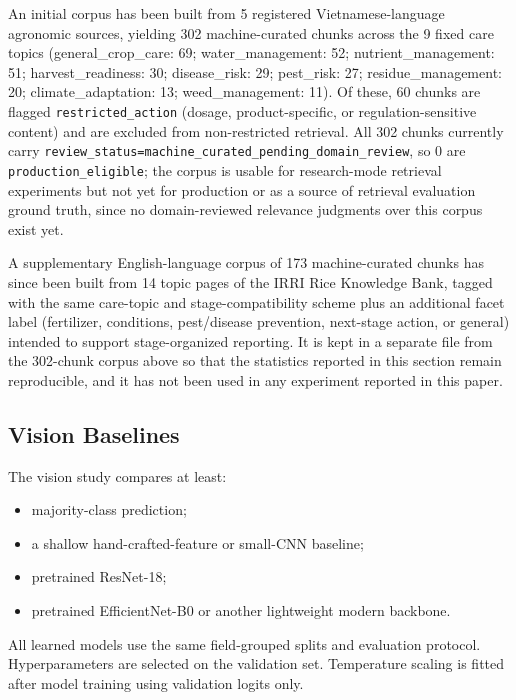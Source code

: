 \documentclass[conference]{IEEEtran}
\begin{document}
An initial corpus has been built from 5 registered Vietnamese-language agronomic sources, yielding 302 machine-curated chunks across the 9 fixed care topics (general\_crop\_care: 69; water\_management: 52; nutrient\_management: 51; harvest\_readiness: 30; disease\_risk: 29; pest\_risk: 27; residue\_management: 20; climate\_adaptation: 13; weed\_management: 11). Of these, 60 chunks are flagged \texttt{restricted\_action} (dosage, product-specific, or regulation-sensitive content) and are excluded from non-restricted retrieval. All 302 chunks currently carry \texttt{review\_status=machine\_curated\_pending\_domain\_review}, so 0 are \texttt{production\_eligible}; the corpus is usable for research-mode retrieval experiments but not yet for production or as a source of retrieval evaluation ground truth, since no domain-reviewed relevance judgments over this corpus exist yet.

A supplementary English-language corpus of 173 machine-curated chunks has since been built from 14 topic pages of the IRRI Rice Knowledge Bank, tagged with the same care-topic and stage-compatibility scheme plus an additional facet label (fertilizer, conditions, pest/disease prevention, next-stage action, or general) intended to support stage-organized reporting. It is kept in a separate file from the 302-chunk corpus above so that the statistics reported in this section remain reproducible, and it has not been used in any experiment reported in this paper.

\subsection{Vision Baselines}
The vision study compares at least:
\begin{itemize}[leftmargin=*,nosep]
    \item majority-class prediction;
    \item a shallow hand-crafted-feature or small-CNN baseline;
    \item pretrained ResNet-18;
    \item pretrained EfficientNet-B0 or another lightweight modern backbone.
\end{itemize}
All learned models use the same field-grouped splits and evaluation protocol. Hyperparameters are selected on the validation set. Temperature scaling is fitted after model training using validation logits only.
\end{document}
